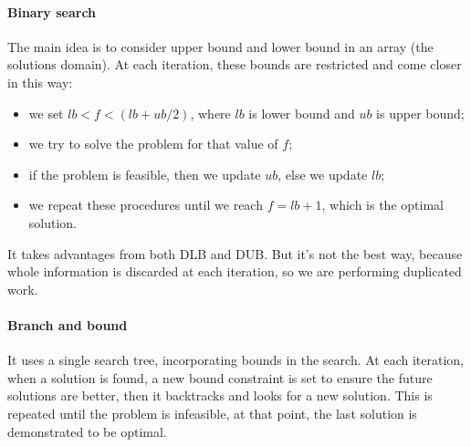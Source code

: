 \documentclass[10pt,a4paper]{article}
\begin{document}
\paragraph{Binary search}
The main idea is to consider upper bound and lower bound in an array (the
solutions domain). At each iteration, these bounds are restricted and come
closer in this way:
\begin{itemize}
    \item we set $lb < f < (lb + ub / 2)$, where $lb$ is lower bound and $ub$ is
    upper bound;
    \item we try to solve the problem for that value of $f$;
    \item if the problem is feasible, then we update $ub$, else we update $lb$;
    \item we repeat these procedures until we reach $f = lb + 1$, which is the
    optimal solution.
\end{itemize}
It takes advantages from both DLB and DUB. But it's not the best way, because
whole information is discarded at each iteration, so we are performing
duplicated work.

\paragraph{Branch and bound}
It uses a single search tree, incorporating bounds in the search. At each
iteration, when a solution is found, a new bound constraint is set to ensure the
future solutions are better, then it backtracks and looks for a new solution.
This is repeated until the problem is infeasible, at that point, the last
solution is demonstrated to be optimal.
\end{document}

